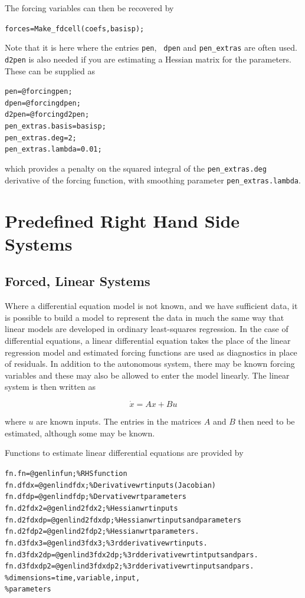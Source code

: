 \documentclass{article}
\newcommand{\nt}    {\noindent}
\begin{document}
\nt The forcing variables can then be recovered by

\begin{alltt}
  forces = Make_fdcell(coefs,basisp);
\end{alltt}

Note that it is here where the entries {\tt pen}, {\tt
dpen} and {\tt pen\_extras} are often used. {\tt d2pen} is
also needed if you are estimating a Hessian matrix for the
parameters. These can be supplied as

\begin{alltt}
  pen   = @forcingpen;
  dpen  = @forcingdpen;
  d2pen = @forcingd2pen;
  pen_extras.basis = basisp;
  pen_extras.deg = 2;
  pen_extras.lambda = 0.01;
\end{alltt}

\nt which provides a penalty on the squared integral of the {\tt pen\_extras.deg}
derivative of the forcing function, with smoothing parameter
{\tt pen\_extras.lambda}.

\section{Predefined Right Hand Side Systems}

\subsection{Forced, Linear Systems}

Where a differential equation model is not known, and we have sufficient data, it is possible to
build a model to represent the data in much the same way that linear models are developed in
ordinary least-squares regression. In the case of differential equations, a linear differential
equation takes the place of the linear regression model and estimated forcing functions are used as
diagnostics in place of residuals. In addition to the autonomous system, there may be known forcing
variables and these may also be allowed to enter the model linearly. The linear system is then
written as

\[ \dot{x} = Ax + Bu \]

\nt where $u$ are known inputs. The entries in the matrices $A$ and $B$
then need to be estimated, although some may be known.

Functions to estimate linear differential equations are
provided by

\begin{alltt}
   fn.fn       = @genlinfun;       \% RHS function
   fn.dfdx     = @genlindfdx;      \% Derivative wrt inputs (Jacobian)
   fn.dfdp     = @genlindfdp;      \% Dervative wrt parameters
   fn.d2fdx2   = @genlind2fdx2;    \% Hessian wrt inputs
   fn.d2fdxdp  = @genlind2fdxdp;   \% Hessian wrt inputs and parameters
   fn.d2fdp2   = @genlind2fdp2;    \% Hessian wrt parameters.
   fn.d3fdx3   = @genlind3fdx3;    \% 3rd derivative wrt inputs.
   fn.d3fdx2dp = @genlind3fdx2dp;  \% 3rd derivative wrt intputs and pars.
   fn.d3fdxdp2 = @genlind3fdxdp2;  \% 3rd derivative wrt inputs and pars.
                                   \% dimensions = time, variable, input,
                                   \% parameters
\end{alltt}
\end{document}
